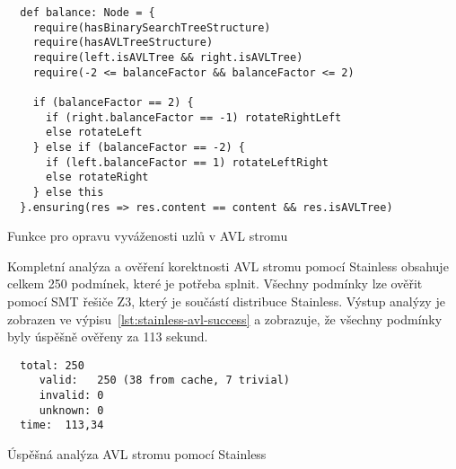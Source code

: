 \begin{listing}[H]
  \begin{verbatim}
  def balance: Node = {
    require(hasBinarySearchTreeStructure)
    require(hasAVLTreeStructure)
    require(left.isAVLTree && right.isAVLTree)
    require(-2 <= balanceFactor && balanceFactor <= 2)

    if (balanceFactor == 2) {
      if (right.balanceFactor == -1) rotateRightLeft
      else rotateLeft
    } else if (balanceFactor == -2) {
      if (left.balanceFactor == 1) rotateLeftRight
      else rotateRight
    } else this
  }.ensuring(res => res.content == content && res.isAVLTree)
  \end{verbatim}
  \caption{Funkce pro opravu vyváženosti uzlů v AVL stromu}
  \label{lst:stainless-avl-balance}
\end{listing}

Kompletní analýza a ověření korektnosti AVL stromu pomocí Stainless
obsahuje celkem 250 podmínek, které je potřeba splnit.
Všechny podmínky lze ověřit pomocí SMT řešiče Z3, který je součástí distribuce Stainless.
Výstup analýzy je zobrazen ve výpisu~\ref{lst:stainless-avl-success} a zobrazuje,
že všechny podmínky byly úspěšně ověřeny za 113 sekund.

\begin{listing}[H]
  \begin{verbatim}
  total: 250
     valid:   250 (38 from cache, 7 trivial)
     invalid: 0
     unknown: 0
  time:  113,34
  \end{verbatim}
  \caption{Úspěšná analýza AVL stromu pomocí Stainless}
  \label{lst:stainless-avl-success}
\end{listing}
